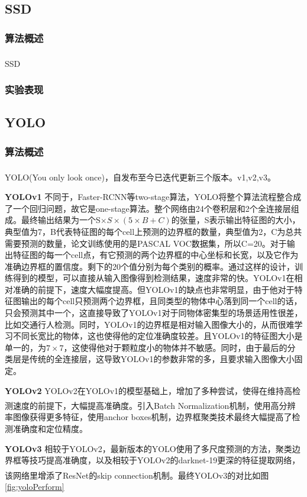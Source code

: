 \documentclass[12pt,a4paper,titlepage]{article}
\newcommand{\upcite}[1]{\textsuperscript{\textsuperscript{\cite{#1}}}}  %
\begin{document}
\subsection{SSD}
\subsubsection{算法概述}
SSD\upcite{liu2016ssd}
\subsubsection{实验表现}

\subsection{YOLO}
\subsubsection{算法概述}
YOLO(You only look once)，自发布至今已迭代更新三个版本。v1\upcite{redmon2016you},v2\upcite{redmon2017yolo9000},v3\upcite{}。\par
\textbf{YOLOv1} 不同于，Faster-RCNN等two-stage算法，YOLO将整个算法流程整合成了一个回归问题，故它是one-stage算法。整个网络由24个卷积层和2个全连接层组成。最终输出结果为一个S$\times S \times(5\times B + C)$的张量，S表示输出特征图的大小，典型值为7，B代表特征图的每个cell上预测的边界框的数量，典型值为2，C为总共需要预测的数量，论文训练使用的是PASCAL VOC数据集，所以C=20。对于输出特征图的每一个cell点，有它预测的两个边界框的中心坐标和长宽，以及它作为准确边界框的置信度。剩下的20个值分别为每个类别的概率。通过这样的设计，训练得到的模型，可以直接从输入图像得到检测结果，速度非常的快。YOLOv1在相对准确的前提下，速度大幅度提高。但YOLOv1的缺点也非常明显，由于他对于特征图输出的每个cell只预测两个边界框，且同类型的物体中心落到同一个cell的话，只会预测其中一个，这直接导致了YOLOv1对于同物体密集型的场景适用性很差，比如交通行人检测。同时，YOLOv1的边界框是相对输入图像大小的，从而很难学习不同长宽比的物体，这也使得他的定位准确度较差。且YOLOv1的特征图大小是单一的，为$7\times 7$，这使得他对于颗粒度小的物体并不敏感。同时，由于最后的分类层是传统的全连接层，这导致YOLOv1的参数非常的多，且要求输入图像大小固定。\par
\textbf{YOLOv2}  YOLOv2在YOLOv1的模型基础上，增加了多种尝试，使得在维持高检测速度的前提下，大幅提高准确度。引入Batch Normalization\upcite{ioffe2015batch}机制，使用高分辨率图像获得更多特征，使用anchor boxes机制，边界框聚类技术最终大幅提高了检测准确度和定位精度。\par
\textbf{YOLOv3}  相较于YOLOv2，最新版本的YOLO使用了多尺度预测的方法，聚类边界框等技巧提高准确度，以及相较于YOLOv2的darknet-19更深的特征提取网络，该网络里增添了ResNet\upcite{he2016deep}的skip connection机制。最终YOLOv3的对比如图\ref{fig:yoloPerform}
\end{document}
